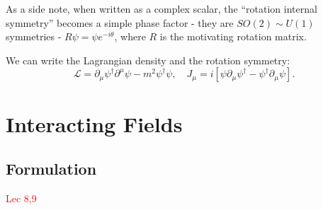 \documentclass{article}
\begin{document}
As a side note, when written as a complex scalar, the ``rotation internal symmetry'' becomes a simple phase factor - they are $SO(2)\sim U(1)$ symmetries - $R\psi = \psi e^{-i\theta}$, where $R$ is the motivating rotation matrix. 

We can write the Lagrangian density and the rotation symmetry:
$$\mathcal L=\partial_\mu\psi^\dag\partial^\mu\psi-m^2\psi^\dag\psi,\quad J_\mu= i\left[\psi\partial_\mu\psi^\dag-\psi^\dag\partial_\mu\psi\right].$$

\pagebreak

\section{Interacting Fields}
\subsection{Formulation}
\textcolor{red}{Lec 8,9}
\end{document}
